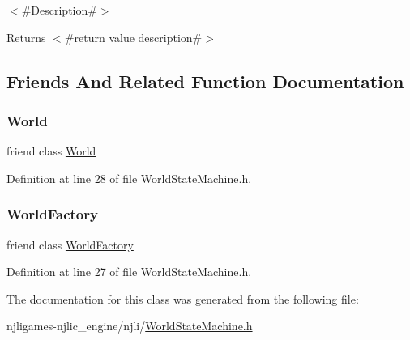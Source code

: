 $<$\#\+Description\#$>$

\begin{DoxyReturn}{Returns}
$<$\#return value description\#$>$ 
\end{DoxyReturn}


\subsection{Friends And Related Function Documentation}
\mbox{\label{classnjli_1_1_world_state_machine_a7b4bcdf992c21ae83363f25df05b1d25}} 
\subsubsection{\texorpdfstring{World}{World}}
{\footnotesize\ttfamily friend class \mbox{\hyperlink{classnjli_1_1_world}{World}}\hspace{0.3cm}{\ttfamily [friend]}}



Definition at line 28 of file World\+State\+Machine.\+h.

\mbox{\label{classnjli_1_1_world_state_machine_acb96ebb09abe8f2a37a915a842babfac}} 
\subsubsection{\texorpdfstring{World\+Factory}{WorldFactory}}
{\footnotesize\ttfamily friend class \mbox{\hyperlink{classnjli_1_1_world_factory}{World\+Factory}}\hspace{0.3cm}{\ttfamily [friend]}}



Definition at line 27 of file World\+State\+Machine.\+h.



The documentation for this class was generated from the following file\+:\begin{DoxyCompactItemize}
\item 
njligames-\/njlic\+\_\+engine/njli/\mbox{\hyperlink{_world_state_machine_8h}{World\+State\+Machine.\+h}}\end{DoxyCompactItemize}
